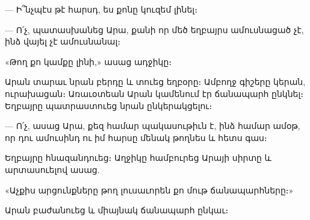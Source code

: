 \documentclass{article}
\begin{document}
{— Ի՞նչպէս թէ հարսդ, ես քոնը կուզեմ լինել։

— Ո՛չ, պատասխանեց Արա, քանի որ մեծ եղբայրս ամուսնացած չէ, ինձ վայել չէ ամուսնանալ։

«Թող քո կամքը լինի,» ասաց ադջիկը։

Արան տարաւ նրան բերդը և տուեց եղբօրը։ Ամբողջ գիշերը կերան, ուրախացան։ Առաւօտեան Արան կամենում էր ճանապարհ ընկնել։ Եղբայրը պատրաստուեց նրան ընկերակցելու։

— Ո՛չ, ասաց Արա, քեզ համար պակասութիւն է, ինձ համար ամօթ, որ դու ամուսինդ ու իմ հարսը մենակ թողնես և հետս գաս։

Եղբայրը հնազանդուեց։ Աղջիկը համբուրեց Արայի սիրտը և արտասուելով ասաց.

«Աչքիս արցունքները թող լուսաւորեն քո մութ ճանապարհները։»

Արան բաժանուեց և միայնակ ճանապարհ ընկաւ։}
\clearpage
\section{}
\end{document}
